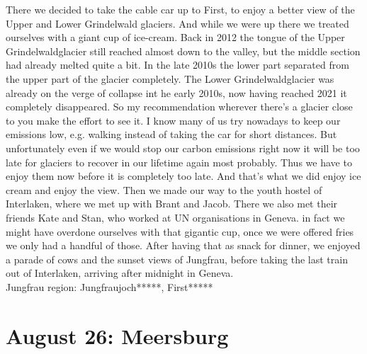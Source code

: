 There we decided to take the cable car up to First, to enjoy a better view of the Upper and Lower Grindelwald glaciers. And while we were up there we treated ourselves with a giant cup of ice-cream. Back in 2012 the tongue of the Upper Grindelwaldglacier still reached almost down to the valley, but the middle section had already melted quite a bit. In the late 2010s the lower part separated from the upper part of the glacier completely. The Lower Grindelwaldglacier was already on the verge of collapse int he early 2010s, now having reached 2021 it completely disappeared. So my recommendation wherever there's a glacier close to you make the effort to see it. I know many of us try nowadays to keep our emissions low, e.g. walking instead of taking the car for short distances. But unfortunately even if we would stop our carbon emissions right now it will be too late for glaciers to recover in our lifetime again most probably. Thus we have to enjoy them now before it is completely too late. And that's what we did enjoy ice cream and enjoy the view. Then we made our way to the youth hostel of Interlaken, where we met up with Brant and Jacob. There we also met their friends Kate and Stan, who worked at UN organisations in Geneva. in fact we might have overdone ourselves with that gigantic cup, once we were offered fries we only had a handful of those. After having that as snack for dinner, we enjoyed a parade of cows and the sunset views of Jungfrau, before taking the last train out of Interlaken, arriving after midnight in Geneva.\\

Jungfrau region: Jungfraujoch*****, First*****

\section{August 26: Meersburg}
\label{Meersburg2018}

